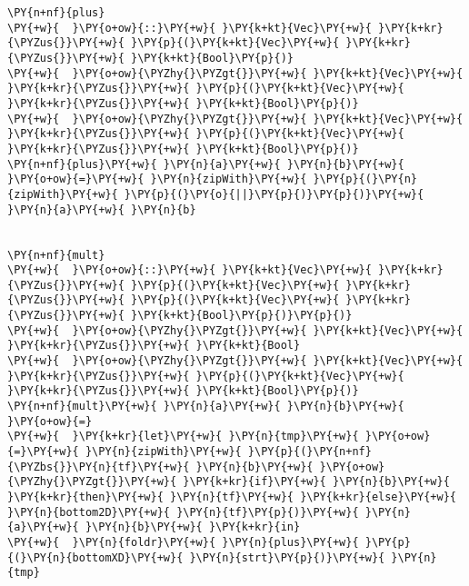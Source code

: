 {\begin{Verbatim}[commandchars=\\\{\}]
\PY{n+nf}{plus}
\PY{+w}{  }\PY{o+ow}{::}\PY{+w}{ }\PY{k+kt}{Vec}\PY{+w}{ }\PY{k+kr}{\PYZus{}}\PY{+w}{ }\PY{p}{(}\PY{k+kt}{Vec}\PY{+w}{ }\PY{k+kr}{\PYZus{}}\PY{+w}{ }\PY{k+kt}{Bool}\PY{p}{)}
\PY{+w}{  }\PY{o+ow}{\PYZhy{}\PYZgt{}}\PY{+w}{ }\PY{k+kt}{Vec}\PY{+w}{ }\PY{k+kr}{\PYZus{}}\PY{+w}{ }\PY{p}{(}\PY{k+kt}{Vec}\PY{+w}{ }\PY{k+kr}{\PYZus{}}\PY{+w}{ }\PY{k+kt}{Bool}\PY{p}{)}
\PY{+w}{  }\PY{o+ow}{\PYZhy{}\PYZgt{}}\PY{+w}{ }\PY{k+kt}{Vec}\PY{+w}{ }\PY{k+kr}{\PYZus{}}\PY{+w}{ }\PY{p}{(}\PY{k+kt}{Vec}\PY{+w}{ }\PY{k+kr}{\PYZus{}}\PY{+w}{ }\PY{k+kt}{Bool}\PY{p}{)}
\PY{n+nf}{plus}\PY{+w}{ }\PY{n}{a}\PY{+w}{ }\PY{n}{b}\PY{+w}{ }\PY{o+ow}{=}\PY{+w}{ }\PY{n}{zipWith}\PY{+w}{ }\PY{p}{(}\PY{n}{zipWith}\PY{+w}{ }\PY{p}{(}\PY{o}{||}\PY{p}{)}\PY{p}{)}\PY{+w}{ }\PY{n}{a}\PY{+w}{ }\PY{n}{b}


\PY{n+nf}{mult}
\PY{+w}{  }\PY{o+ow}{::}\PY{+w}{ }\PY{k+kt}{Vec}\PY{+w}{ }\PY{k+kr}{\PYZus{}}\PY{+w}{ }\PY{p}{(}\PY{k+kt}{Vec}\PY{+w}{ }\PY{k+kr}{\PYZus{}}\PY{+w}{ }\PY{p}{(}\PY{k+kt}{Vec}\PY{+w}{ }\PY{k+kr}{\PYZus{}}\PY{+w}{ }\PY{k+kt}{Bool}\PY{p}{)}\PY{p}{)}
\PY{+w}{  }\PY{o+ow}{\PYZhy{}\PYZgt{}}\PY{+w}{ }\PY{k+kt}{Vec}\PY{+w}{ }\PY{k+kr}{\PYZus{}}\PY{+w}{ }\PY{k+kt}{Bool}
\PY{+w}{  }\PY{o+ow}{\PYZhy{}\PYZgt{}}\PY{+w}{ }\PY{k+kt}{Vec}\PY{+w}{ }\PY{k+kr}{\PYZus{}}\PY{+w}{ }\PY{p}{(}\PY{k+kt}{Vec}\PY{+w}{ }\PY{k+kr}{\PYZus{}}\PY{+w}{ }\PY{k+kt}{Bool}\PY{p}{)}
\PY{n+nf}{mult}\PY{+w}{ }\PY{n}{a}\PY{+w}{ }\PY{n}{b}\PY{+w}{ }\PY{o+ow}{=}
\PY{+w}{  }\PY{k+kr}{let}\PY{+w}{ }\PY{n}{tmp}\PY{+w}{ }\PY{o+ow}{=}\PY{+w}{ }\PY{n}{zipWith}\PY{+w}{ }\PY{p}{(}\PY{n+nf}{\PYZbs{}}\PY{n}{tf}\PY{+w}{ }\PY{n}{b}\PY{+w}{ }\PY{o+ow}{\PYZhy{}\PYZgt{}}\PY{+w}{ }\PY{k+kr}{if}\PY{+w}{ }\PY{n}{b}\PY{+w}{ }\PY{k+kr}{then}\PY{+w}{ }\PY{n}{tf}\PY{+w}{ }\PY{k+kr}{else}\PY{+w}{ }\PY{n}{bottom2D}\PY{+w}{ }\PY{n}{tf}\PY{p}{)}\PY{+w}{ }\PY{n}{a}\PY{+w}{ }\PY{n}{b}\PY{+w}{ }\PY{k+kr}{in}
\PY{+w}{  }\PY{n}{foldr}\PY{+w}{ }\PY{n}{plus}\PY{+w}{ }\PY{p}{(}\PY{n}{bottomXD}\PY{+w}{ }\PY{n}{strt}\PY{p}{)}\PY{+w}{ }\PY{n}{tmp}


\end{Verbatim}}
